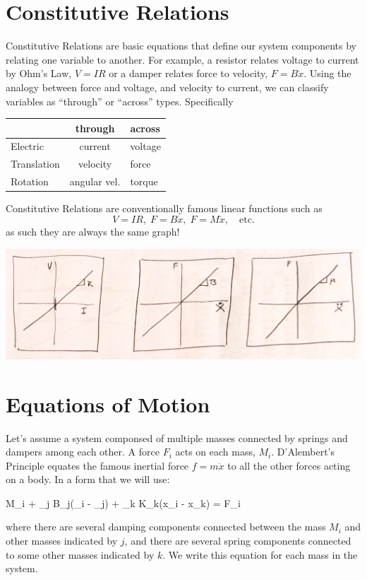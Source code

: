 \section{Constitutive Relations}
Constitutive Relations are basic equations that define our system components by relating one variable to another.  For example,
a resistor relates voltage to current by Ohm's Law, $V=IR$ or a damper relates force to velocity, $F=B\dot{x}$.   Using the
analogy between force and voltage, and velocity to current, we can classify variables as ``through'' or ``across'' types.  Specifically

\vspace{0.25in}
\begin{tabular}{l|c|l}
           & through & across\\ \hline
Electric   & current  & voltage \\
Translation & velocity & force \\
Rotation   & angular vel.  & torque
\end{tabular}

Constitutive Relations are conventionally famous linear  functions such as
 \[
 V=IR, \; F= B\dot{x},\; F=M\ddot{x}, \quad \mathrm{etc.}
 \]
as such they are always the same graph!

\includegraphics[width=150mm]{figs02/Q68B24.png}



\section{Equations of Motion}

Let's assume a system componsed of multiple masses connected by springs and dampers among each other.   A force $F_i$ acts on each mass, $M_i$.   D'Alembert's Principle equates the famous inertial force $f=m\ddot{x}$ to all the other forces acting on a body.   In a form that we will use:

\bq\label{D'Alembert}
M_i  + \sum_j B_j(_i - _j) + \sum_k K_k(x_i - x_k) = F_i
\eq

where there are several damping components connected between the mass $M_i$ and other masses indicated by $j$, and there are several
spring components connected to some other masses indicated by $k$.  We write this equation for each mass in the system.

